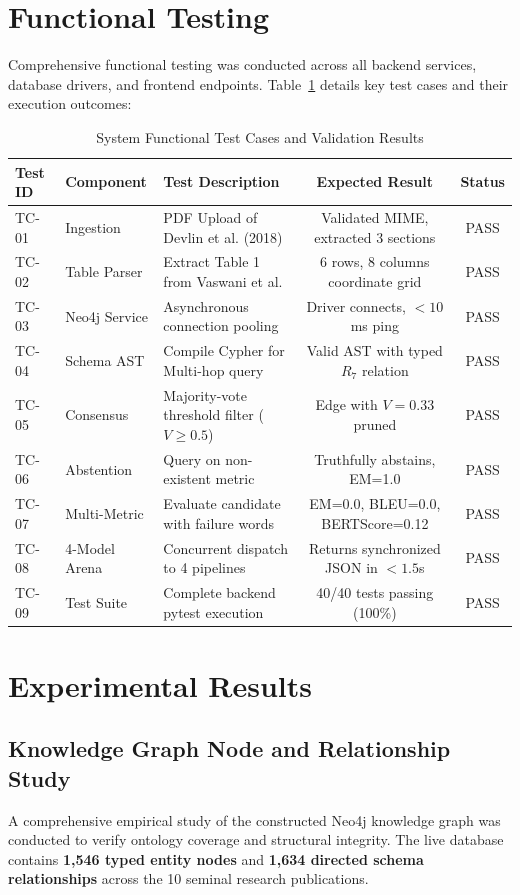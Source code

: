 \documentclass[12pt,a4paper,oneside]{report}
\begin{document}
\section{Functional Testing}
Comprehensive functional testing was conducted across all backend services, database drivers, and frontend endpoints. Table~\ref{tab:test_cases} details key test cases and their execution outcomes:

\begin{table}[h]
\centering
\caption{System Functional Test Cases and Validation Results}
\label{tab:test_cases}
\small
\begin{tabular}{lllcc}
\toprule
\textbf{Test ID} & \textbf{Component} & \textbf{Test Description} & \textbf{Expected Result} & \textbf{Status} \\
\midrule
TC-01 & Ingestion & PDF Upload of Devlin et al. (2018) & Validated MIME, extracted 3 sections & PASS \\
TC-02 & Table Parser & Extract Table 1 from Vaswani et al. & 6 rows, 8 columns coordinate grid & PASS \\
TC-03 & Neo4j Service & Asynchronous connection pooling & Driver connects, $<10$ms ping & PASS \\
TC-04 & Schema AST & Compile Cypher for Multi-hop query & Valid AST with typed $R_7$ relation & PASS \\
TC-05 & Consensus & Majority-vote threshold filter ($V \ge 0.5$) & Edge with $V=0.33$ pruned & PASS \\
TC-06 & Abstention & Query on non-existent metric & Truthfully abstains, EM=1.0 & PASS \\
TC-07 & Multi-Metric & Evaluate candidate with failure words & EM=0.0, BLEU=0.0, BERTScore=0.12 & PASS \\
TC-08 & 4-Model Arena & Concurrent dispatch to 4 pipelines & Returns synchronized JSON in $<1.5$s & PASS \\
TC-09 & Test Suite & Complete backend pytest execution & 40/40 tests passing (100\%) & PASS \\
\bottomrule
\end{tabular}
\end{table}

\section{Experimental Results}

\subsection{Knowledge Graph Node and Relationship Study}
A comprehensive empirical study of the constructed Neo4j knowledge graph was conducted to verify ontology coverage and structural integrity. The live database contains \textbf{1,546 typed entity nodes} and \textbf{1,634 directed schema relationships} across the 10 seminal research publications.
\end{document}
